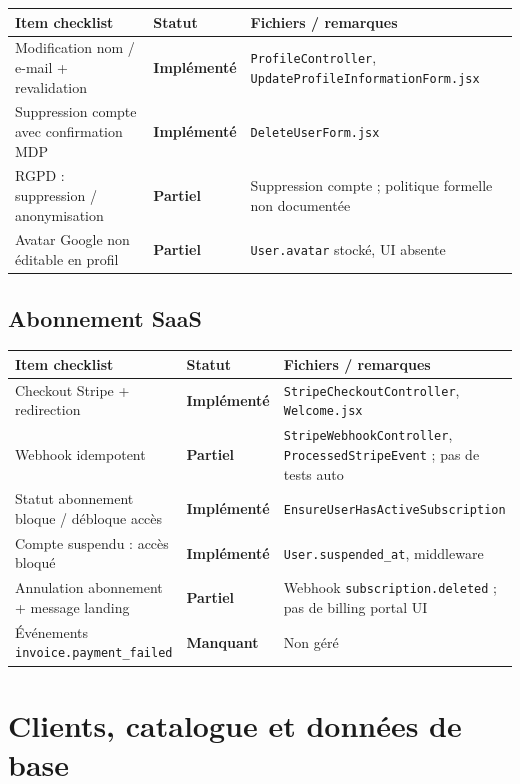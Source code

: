 \documentclass[11pt,a4paper]{report}
\newcommand{\route}[1]{\texttt{\small #1}}
\newcommand{\ctrl}[1]{\texttt{\small #1}}
\newcommand{\model}[1]{\texttt{\small #1}}
\newcommand{\statimpl}{\textcolor{statok}{\textbf{Implémenté}}}
\newcommand{\statpart}{\textcolor{statpartial}{\textbf{Partiel}}}
\newcommand{\statmiss}{\textcolor{statno}{\textbf{Manquant}}}
\begin{document}
\begin{longtable}{@{}L{7.8cm}C{2.4cm}L{4.4cm}@{}}
    \toprule
    \textbf{Item checklist} & \textbf{Statut} & \textbf{Fichiers / remarques} \\
    \midrule
    \endhead
    Modification nom / e-mail + revalidation & \statimpl & \ctrl{ProfileController}, \route{UpdateProfileInformationForm.jsx} \\
    Suppression compte avec confirmation MDP & \statimpl & \route{DeleteUserForm.jsx} \\
    RGPD : suppression / anonymisation & \statpart & Suppression compte ; politique formelle non documentée \\
    Avatar Google non éditable en profil & \statpart & \model{User.avatar} stocké, UI absente \\
    \bottomrule
\end{longtable}

\section{Abonnement SaaS}

\begin{longtable}{@{}L{7.8cm}C{2.4cm}L{4.4cm}@{}}
    \toprule
    \textbf{Item checklist} & \textbf{Statut} & \textbf{Fichiers / remarques} \\
    \midrule
    \endhead
    Checkout Stripe + redirection & \statimpl & \ctrl{StripeCheckoutController}, \route{Welcome.jsx} \\
    Webhook idempotent & \statpart & \ctrl{StripeWebhookController}, \model{ProcessedStripeEvent} ; pas de tests auto \\
    Statut abonnement bloque / débloque accès & \statimpl & \ctrl{EnsureUserHasActiveSubscription} \\
    Compte suspendu : accès bloqué & \statimpl & \model{User.suspended\_at}, middleware \\
    Annulation abonnement + message landing & \statpart & Webhook \texttt{subscription.deleted} ; pas de billing portal UI \\
    Événements \texttt{invoice.payment\_failed} & \statmiss & Non géré \\
    \bottomrule
\end{longtable}

\chapter{Clients, catalogue et données de base}
\end{document}

